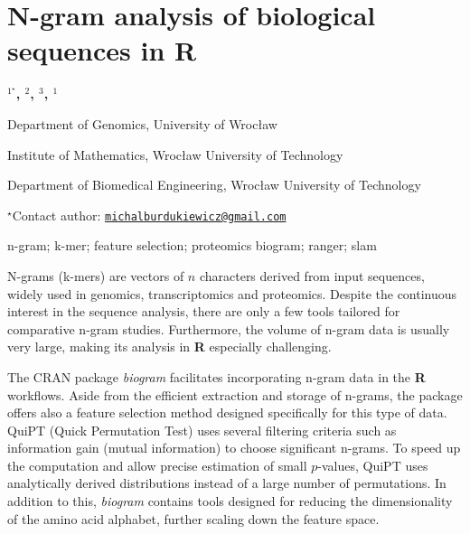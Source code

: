 \documentclass[\main/boa.tex]{subfiles}
\begin{document}
\section{N-gram analysis of biological sequences in R}

\begin{center}
  {\bf {}$^{1^\star}$, $^{2}$, $^{3}$, $^{1}$}
\end{center}

\vskip 0.3cm

\begin{affiliations}
\begin{enumerate}
\begin{minipage}{0.915\textwidth}
\centering
\item Department of Genomics, University of Wrocław \\[-2pt]
\item Institute of Mathematics, Wrocław University of Technology \\[-2pt]
\item Department of Biomedical Engineering, Wrocław University of Technology \\[-2pt]
\end{minipage}
\end{enumerate}
$^\star$Contact author: \href{mailto:michalburdukiewicz@gmail.com}{\nolinkurl{michalburdukiewicz@gmail.com}}\\
\end{affiliations}

\vskip 0.5cm

\begin{minipage}{0.915\textwidth}
\keywords n-gram; k-mer; feature selection; proteomics
\packages biogram; ranger; slam
\end{minipage}

\vskip 0.8cm

N-grams (k-mers) are vectors of \(n\) characters derived from input
sequences, widely used in genomics, transcriptomics and proteomics.
Despite the continuous interest in the sequence analysis, there are only
a few tools tailored for comparative n-gram studies. Furthermore, the
volume of n-gram data is usually very large, making its analysis in
\textbf{R} especially challenging.

The CRAN package \emph{biogram} facilitates incorporating n-gram data in
the \textbf{R} workflows. Aside from the efficient extraction and
storage of n-grams, the package offers also a feature selection method
designed specifically for this type of data. QuiPT (Quick Permutation
Test) uses several filtering criteria such as information gain (mutual
information) to choose significant n-grams. To speed up the computation
and allow precise estimation of small \(p\)-values, QuiPT uses
analytically derived distributions instead of a large number of
permutations. In addition to this, \emph{biogram} contains tools
designed for reducing the dimensionality of the amino acid alphabet,
further scaling down the feature space.
\end{document}
